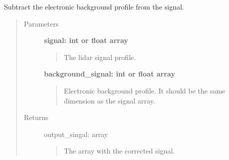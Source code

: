 \documentclass[letterpaper,10pt,english]{sphinxmanual}
\begin{document}
\begin{fulllineitems}
\label{pre_processing:pre_processing.subtract_electronic_background}
Subtract the electronic background profile from the signal.
\begin{quote}\begin{description}
\item[{Parameters}] \leavevmode
\textbf{signal: int or float array}
\begin{quote}

The lidar signal profile.
\end{quote}

\textbf{background\_signal: int or float array}
\begin{quote}

Electronic background profile. It should be the same dimension as the signal array.
\end{quote}

\item[{Returns}] \leavevmode
output\_singal: array
\begin{quote}

The array with the corrected signal.
\end{quote}

\end{description}\end{quote}

\end{fulllineitems}

\end{document}
